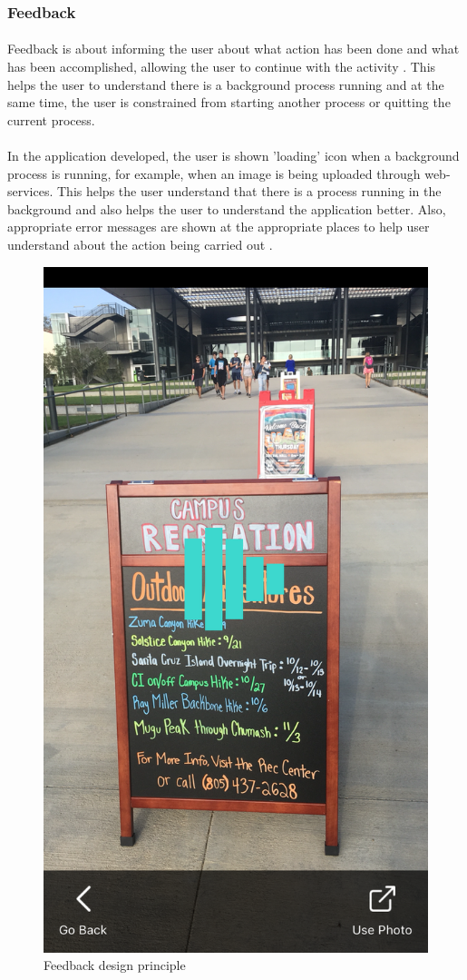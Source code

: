 \documentclass[12pt]{article}
\begin{document}
        \subsubsection{Feedback}
       \paragraph{}Feedback is about informing the user about what action has been done and what has been accomplished, allowing the user to continue with the activity \cite{norman}. This helps the user to understand there is a background process running and at the same time, the user is constrained from starting another process or quitting the current process. 
       
       \paragraph{}In the application developed, the user is shown 'loading' icon when a background process is running, for example, when an image is being uploaded through web-services. This helps the user understand that there is a process running in the background and also helps the user to understand the application better. Also, appropriate error messages are shown at the appropriate places to help user understand about the action being carried out \cite{norman}.
       
       \begin{figure}[H]
	\centering
	\includegraphics[width=0.5\linewidth]{media/loading1.PNG}
	\caption{Feedback design principle}
	\label{fig:feedback}
\end{figure} 
\end{document}
